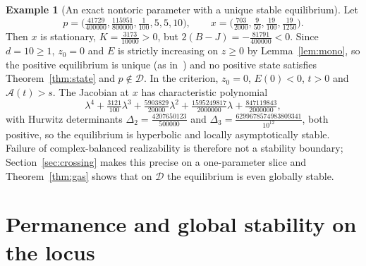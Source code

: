 \documentclass[11pt,a4paper]{article}
\theoremstyle{plain}
\theoremstyle{definition}
\newtheorem{example}[theorem]{Example}
\theoremstyle{remark}
\newcommand{\DT}{\mathcal{D}}
\newcommand{\rA}{\mathcal{A}}
\begin{document}
\begin{example}[An exact nontoric parameter with a unique stable equilibrium]\label{ex:negative}
Let
\[
p=\bigl(\tfrac{41729}{400000},\tfrac{115951}{800000},\tfrac1{100},5,5,10\bigr),\qquad
x=\bigl(\tfrac{703}{2000},\tfrac{9}{50},\tfrac{19}{100},\tfrac{19}{1250}\bigr).
\]
Then $x$ is stationary, $K=\tfrac{3173}{10000}>0$, but $2(B-J)=-\tfrac{81791}{400000}<0$. Since $d=10\ge1$, $z_0=0$ and $E$ is strictly increasing on $z\ge0$ by Lemma~\ref{lem:mono}, so the positive equilibrium is unique (as in~\cite{FeedbackBistability2026}) and no positive state satisfies Theorem~\ref{thm:state} and $p\notin\DT$. In the criterion, $z_0=0$, $E(0)<0$, $t>0$ and $\rA(t)>s$. The Jacobian at $x$ has characteristic polynomial
\[
\lambda^4+\tfrac{3121}{100}\lambda^3+\tfrac{5903829}{20000}\lambda^2+\tfrac{1595249817}{2000000}\lambda+\tfrac{847119843}{2000000},
\]
with Hurwitz determinants $\Delta_2=\tfrac{4207650123}{500000}$ and $\Delta_3=\tfrac{6299678574983809341}{10^{12}}$, both positive, so the equilibrium is hyperbolic and locally asymptotically stable. Failure of complex-balanced realizability is therefore not a stability boundary; Section~\ref{sec:crossing} makes this precise on a one-parameter slice and Theorem~\ref{thm:gas} shows that on $\DT$ the equilibrium is even globally stable.
\end{example}

\section{Permanence and global stability on the locus}\label{sec:dynamics}
\end{document}
